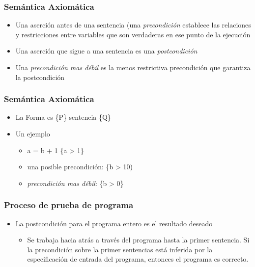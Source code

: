 \documentclass[11pt]{article}
\begin{document}
\subsubsection*{Semántica Axiomática}
\label{sec:org0204334}
\begin{itemize}
\item Una aserción antes de una sentencia (una \emph{precondición} establece
las relaciones y restricciones entre variables que son verdaderas en
ese punto de la ejecución
\item Una aserción que sigue a una sentencia es una \emph{postcondición}
\item Una \emph{precondición mas débil} es la menos restrictiva precondición
que garantiza la postcondición
\end{itemize}

\subsubsection*{Semántica Axiomática}
\label{sec:orgbd21fc1}
\begin{itemize}
\item La Forma es \{P\} sentencia \{Q\}
\item Un ejemplo
\begin{itemize}
\item a = b + 1 \{a > 1\}
\item una posible precondición: \{b > 10)
\item \emph{precondición mas débil}: \{b > 0\}
\end{itemize}
\end{itemize}

\subsubsection*{Proceso de prueba de programa}
\label{sec:orgacbbe55}
\begin{itemize}
\item La postcondición para el programa entero es el resultado deseado
\begin{itemize}
\item Se trabaja hacia atrás a través del programa hasta la primer
sentencia. Si la precondición sobre la primer sentencias está
inferida por la especificación de entrada del programa, entonces
el programa es correcto.
\end{itemize}
\end{itemize}
\end{document}

